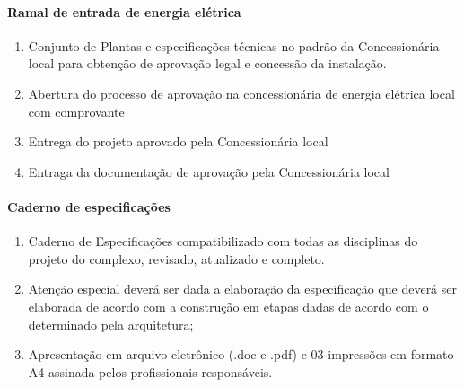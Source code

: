 \paragraph{Ramal de entrada de energia elétrica}
\begin{enumerate}

\item Conjunto de Plantas e especificações técnicas no padrão da Concessionária local para obtenção de aprovação legal e concessão da instalação.

\item Abertura do processo de aprovação na concessionária de energia elétrica local com comprovante

\item Entrega do projeto aprovado pela Concessionária local

\item Entraga da documentação de aprovação pela Concessionária local
\end{enumerate}


\paragraph{Caderno de especificações}
	\begin{enumerate}

		\item Caderno de Especificações compatibilizado com todas as disciplinas do projeto do complexo, revisado, atualizado e completo.

		\item Atenção especial deverá ser dada a elaboração da especificação que deverá ser elaborada de acordo com a construção em etapas dadas de acordo com o determinado pela arquitetura;

		\item Apresentação em arquivo eletrônico (.doc e .pdf) e 03 impressões em formato A4 assinada pelos profissionais responsáveis.
	\end{enumerate}


